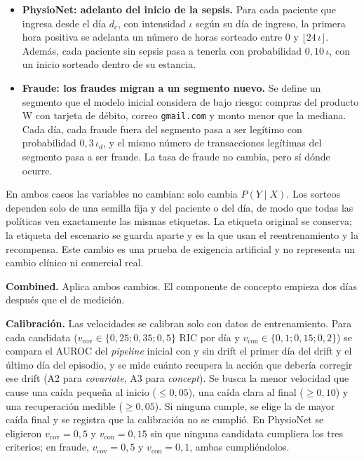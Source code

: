 \begin{itemize}
    \item \textbf{PhysioNet: adelanto del inicio de la sepsis.} Para cada paciente que ingresa
    desde el día $d_c$, con intensidad $\iota$ según su día de ingreso, la primera hora positiva
    se adelanta un número de horas sorteado entre 0 y $\lfloor 24\,\iota \rfloor$. Además, cada
    paciente sin sepsis pasa a tenerla con probabilidad $0{,}10\,\iota$, con un inicio sorteado
    dentro de su estancia.
    \item \textbf{Fraude: los fraudes migran a un segmento nuevo.} Se define un segmento que el
    modelo inicial considera de bajo riesgo: compras del producto W con tarjeta de débito,
    correo \texttt{gmail.com} y monto menor que la mediana. Cada día, cada fraude fuera del
    segmento pasa a ser legítimo con probabilidad $0{,}3\,\iota_d$, y el mismo número de
    transacciones legítimas del segmento pasa a ser fraude. La tasa de fraude no cambia, pero sí
    dónde ocurre.
\end{itemize}

En ambos casos las variables no cambian: solo cambia $P(Y \mid X)$. Los sorteos dependen solo de
una semilla fija y del paciente o del día, de modo que todas las políticas ven exactamente las
mismas etiquetas. La etiqueta original se conserva; la etiqueta del escenario se guarda aparte
y es la que usan el reentrenamiento y la recompensa. Este cambio es una prueba de exigencia
artificial y no representa un cambio clínico ni comercial real.

\textbf{Combined.} Aplica ambos cambios. El componente de concepto empieza dos días después que
el de medición.

\textbf{Calibración.} Las velocidades se calibran solo con datos de entrenamiento. Para cada
candidata ($v_{\text{cov}} \in \{0{,}25; 0{,}35; 0{,}5\}$ RIC por día y $v_{\text{con}} \in
\{0{,}1; 0{,}15; 0{,}2\}$) se compara el AUROC del \textit{pipeline} inicial con y sin drift el
primer día del drift y el último día del episodio, y se mide cuánto recupera la acción que
debería corregir ese drift (A2 para \textit{covariate}, A3 para \textit{concept}). Se busca la
menor velocidad que cause una caída pequeña al inicio ($\leq 0{,}05$), una caída clara al final
($\geq 0{,}10$) y una recuperación medible ($\geq 0{,}05$). Si ninguna cumple, se elige la de
mayor caída final y se registra que la calibración no se cumplió. En PhysioNet se eligieron
$v_{\text{cov}} = 0{,}5$ y $v_{\text{con}} = 0{,}15$ sin que ninguna candidata cumpliera los tres
criterios; en fraude, $v_{\text{cov}} = 0{,}5$ y $v_{\text{con}} = 0{,}1$, ambas cumpliéndolos.

